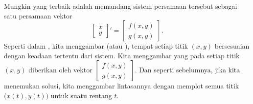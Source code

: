 Mungkin yang terbaik adalah memandang sistem persamaan tersebut sebagai satu persamaan vektor
\begin{equation} \label{eq:nlinautn2}
\begin{bmatrix} x \\ y \end{bmatrix} ' =
\begin{bmatrix} f(x,y) \\ g(x,y) \end{bmatrix} .
\end{equation}
Seperti dalam , kita menggambar
\emph{} (atau \emph{}),
tempat setiap titik $(x,y)$ bersesuaian dengan keadaan tertentu dari sistem.
Kita menggambar \emph{}
yang pada setiap
titik $(x,y)$ diberikan oleh vektor
$\left[ \begin{smallmatrix} f(x,y) \\ g(x,y) \end{smallmatrix} \right]$.
Dan seperti sebelumnya, jika kita menemukan solusi, kita menggambar lintasannya
dengan memplot semua titik $\bigl(x(t),y(t)\bigr)$ untuk suatu rentang $t$.

